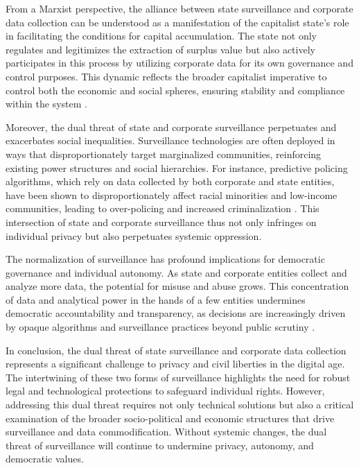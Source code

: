 \begin{refsection}
From a Marxist perspective, the alliance between state surveillance and corporate data collection can be understood as a manifestation of the capitalist state's role in facilitating the conditions for capital accumulation. The state not only regulates and legitimizes the extraction of surplus value but also actively participates in this process by utilizing corporate data for its own governance and control purposes. This dynamic reflects the broader capitalist imperative to control both the economic and social spheres, ensuring stability and compliance within the system \cite[pp.~329-332]{harvey2005brief}.

Moreover, the dual threat of state and corporate surveillance perpetuates and exacerbates social inequalities. Surveillance technologies are often deployed in ways that disproportionately target marginalized communities, reinforcing existing power structures and social hierarchies. For instance, predictive policing algorithms, which rely on data collected by both corporate and state entities, have been shown to disproportionately affect racial minorities and low-income communities, leading to over-policing and increased criminalization \cite[pp.~97-100]{eubanks2018automating}. This intersection of state and corporate surveillance thus not only infringes on individual privacy but also perpetuates systemic oppression.

The normalization of surveillance has profound implications for democratic governance and individual autonomy. As state and corporate entities collect and analyze more data, the potential for misuse and abuse grows. This concentration of data and analytical power in the hands of a few entities undermines democratic accountability and transparency, as decisions are increasingly driven by opaque algorithms and surveillance practices beyond public scrutiny \cite[pp.~73-76]{pasquale2016black}.

In conclusion, the dual threat of state surveillance and corporate data collection represents a significant challenge to privacy and civil liberties in the digital age. The intertwining of these two forms of surveillance highlights the need for robust legal and technological protections to safeguard individual rights. However, addressing this dual threat requires not only technical solutions but also a critical examination of the broader socio-political and economic structures that drive surveillance and data commodification. Without systemic changes, the dual threat of surveillance will continue to undermine privacy, autonomy, and democratic values.


\end{refsection}
